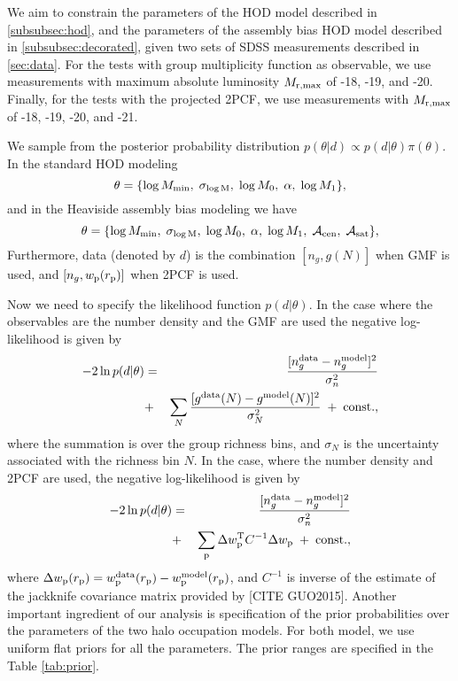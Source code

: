\documentclass[14pt, preprint]{emulateapj}
\newcommand{\beq}{\begin{equation}}
\newcommand{\eeq}{\end{equation}}
\newcommand{\wpp}{w_{\rm p}}
\newcommand{\rpp}{r_{\rm p}}
\newcommand{\mzero}{\log M_{0}}
\newcommand{\mone}{\log M_{1}}
\newcommand{\mmin}{\log M_{\rm min}}
\newcommand{\sigmam}{\sigma_{\log \rm M}}
\newcommand{\acen}{\mathcal{A}_{\rm cen}}
\newcommand{\asat}{\mathcal{A}_{\rm sat}}
\begin{document}
We aim to constrain the parameters of the HOD model described in \ref{subsubsec:hod}, and the parameters of the assembly bias HOD model described in \ref{subsubsec:decorated}, given two sets of SDSS measurements described in \ref{sec:data}. For the tests with group multiplicity function as observable, we use measurements with maximum absolute luminosity $M_{\rm r , max}$ of -18, -19, and -20. Finally, for the tests with the projected 2PCF, we use measurements with $M_{\rm r , max}$ of -18, -19, -20, and -21.  

We sample from the posterior probability distribution $p(\theta|d) \propto p(d|\theta) \pi(\theta)$. In the standard HOD modeling 
\beq
\theta = \{ \mmin, \; \sigmam, \; \mzero, \; \alpha, \; \mone \},
\eeq
and in the Heaviside assembly bias modeling we have 
\beq
\theta = \{ \mmin, \; \sigmam, \; \mzero, \; \alpha, \; \mone, \; \acen, \; \asat \},
\eeq
Furthermore, data (denoted by $d$) is the combination $[n_{g},g(N)]$ when GMF is used, and $[n_{g}, w_{\rm{p}}(r_{\rm{p}})]$ when 2PCF is used.

Now we need to specify the likelihood function $p(d|\theta)$. In the case where the observables are the number density and the GMF are used the negative log-likelihood is given by
\begin{eqnarray}
-2\ln p(d|\theta) &=& \frac{[n^{\rm data}_{g}-n^{\rm model}_{g}]^{2}}{\sigma_{n}^{2}} \nonumber \\ &+& \sum_{N} \frac{[ g^{\rm data}(N)-g^{\rm model}(N)]^{2}}{\sigma^{2}_{N}} \; + \; \rm{const.},
\label{eq:lnlike_group}
\end{eqnarray}
where the summation is over the group richness bins, and $\sigma_{N}$ is the uncertainty associated with the richness bin $N$. In the case, where the number density and 2PCF are used, the negative log-likelihood is given by
\begin{eqnarray}
-2\ln p(d|\theta) &=& \frac{[n^{\rm data}_{g}-n^{\rm model}_{g}]^{2}}{\sigma_{n}^{2}} \nonumber \\  
&+&  \sum_{\rm p} \Delta \wpp^{\rm T}C^{-1}\Delta \wpp \; + \; \rm{const.},
\label{eq:lnlike_wp}
\end{eqnarray}
where $\Delta \wpp(\rpp) = \wpp^{\rm data}(\rpp)-\wpp^{\rm model}(\rpp)$, and  $C^{-1}$ is inverse of the estimate of the jackknife covariance matrix provided by [CITE GUO2015]. 
Another important ingredient of our analysis is specification of the prior probabilities over the parameters of the two halo occupation models. For both model, we use uniform flat priors for all the parameters. The prior ranges are specified in the Table \ref{tab:prior}. 
\end{document}
